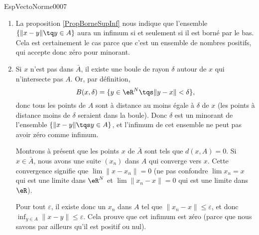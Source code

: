 \begin{corrige}{EspVectoNorme0007}

	\begin{enumerate}
		\item
			La proposition \ref{PropBorneSupInf} nous indique que l'ensemble $\{ \| x-y \|\tq y\in A \}$ aura un infimum si et seulement si il est borné par le bas. Cela est certainement le cas parce que c'est un ensemble de nombres positifs, qui accepte donc zéro pour minorant.

		\item
			Si $x$ n'est pas dans $\bar A$, il existe une boule de rayon $\delta$ autour de $x$ qui n'intersecte pas $A$. Or, par définition,
			\begin{equation}
				B(x,\delta)=\{ y\in\eR^N\tqs\| y-x \|<\delta \},
			\end{equation}
			donc tous les points de $A$ sont à distance au moins égale à $\delta$ de $x$ (les points à distance moins de $\delta$ seraient dans la boule). Donc $\delta$ est un minorant de l'ensemble $\{ \| x-y \|\tqs y\in A \}$, et l'infimum de cet ensemble ne peut pas avoir zéro comme infimum.

			Montrons à présent que les points $x$ de $\bar A$ sont tels que $d(x,A)=0$. Si $x\in\bar A$, nous avons une suite $(x_n)$ dans $A$ qui converge vers $x$. Cette convergence signifie que $\lim\| x-x_n \|=0$ (ne pas confondre $\lim x_n=x$ qui est une limite dans $\eR^N$ et $\lim\| x_n-x \|=0$ qui est une limite dans $\eR$).

			Pour tout $\varepsilon$, il existe donc un $x_n$ dans $A$ tel que $\| x_n-x \|\leq\varepsilon$, et donc $\inf_{y\in A}\| x-y \|\leq\varepsilon$. Cela prouve que cet infimum est zéro (parce que nous savons par ailleurs qu'il est positif ou nul).
			
	\end{enumerate}

\end{corrige}
